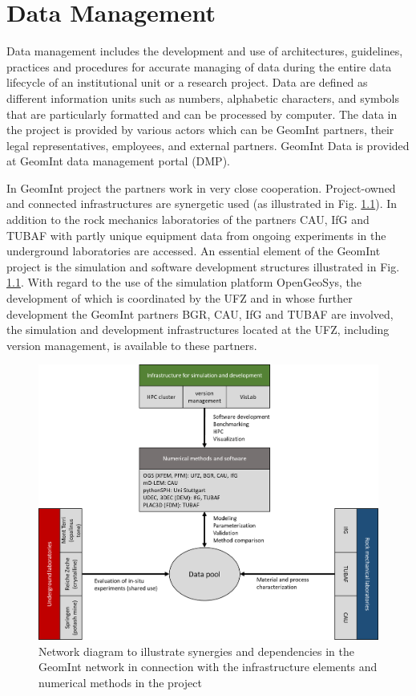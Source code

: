 \chapter{Data Management}
\label{cha:dms}

Data management includes the development and use of architectures, guidelines, practices and procedures for accurate managing of data during the entire data lifecycle of an institutional unit or a research project. Data are defined as different information units such as numbers, alphabetic characters, and symbols that are particularly formatted and can be processed by computer. The data in the project is provided by various actors which can be GeomInt partners, their legal representatives, employees, and external partners. GeomInt Data is provided at GeomInt data management portal (DMP).

In GeomInt project the partners work in very close cooperation. Project-owned and connected infrastructures are synergetic used (as illustrated in Fig. \ref{fig:geomint-dms}). In addition to the rock mechanics laboratories of the partners CAU, IfG and TUBAF with partly unique equipment data from ongoing experiments in the underground laboratories are accessed. An essential element of the GeomInt project is the simulation and software development structures illustrated in Fig. \ref{fig:geomint-dms}. With regard to the use of the simulation platform OpenGeoSys, the development of which is coordinated by the UFZ and in whose further development the GeomInt partners BGR, CAU, IfG and TUBAF are involved, the simulation and development infrastructures located at the UFZ, including version management, is available to these partners. 

\begin{figure}
\includegraphics[width=\textwidth]{figures/geomint-dms_en2.png}
\caption{Network diagram to illustrate synergies and dependencies in the GeomInt network in connection with the infrastructure elements and numerical methods in the project}
\label{fig:geomint-dms}
\end{figure}

